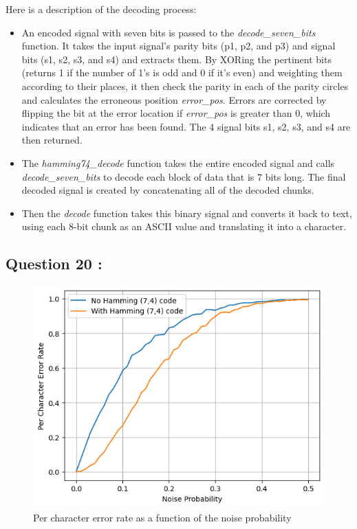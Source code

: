 \documentclass[titlepage]{article}
\begin{document}
Here is a description of the decoding process:
\begin{itemize}
    \item An encoded signal with seven bits is passed to the \textit{decode\_seven\_bits} function. It takes the input signal's parity bits (p1, p2, and p3) and signal bits (s1, s2, s3, and s4) and extracts them. By XORing the pertinent bits (returns 1 if the number of 1's is odd and 0 if it's even) and weighting them according to their places, it then check the parity in each of the parity circles and calculates the erroneous position \textit{error\_pos}. Errors are corrected by flipping the bit at the error location if \textit{error\_pos} is greater than 0, which indicates that an error has been found. The 4 signal bits s1, s2, s3, and s4 are then returned.
    \item The \textit{hamming74\_decode} function takes the entire encoded signal and calls \textit{decode\_seven\_bits} to decode each block of data that is 7 bits long. The final decoded signal is created by concatenating all of the decoded chunks.
    \item Then the \textit{decode} function takes this binary signal and converts it back to text, using each 8-bit chunk as an ASCII value and translating it into a character.
\end{itemize}

\subsection{Question 20 : }

\begin{figure}[H]
  \centering
  \includegraphics[scale=0.5]{q20.png}
  \caption{Per character error rate as a function of the noise probability}
  \label{fig:q20}
\end{figure}
\end{document}
